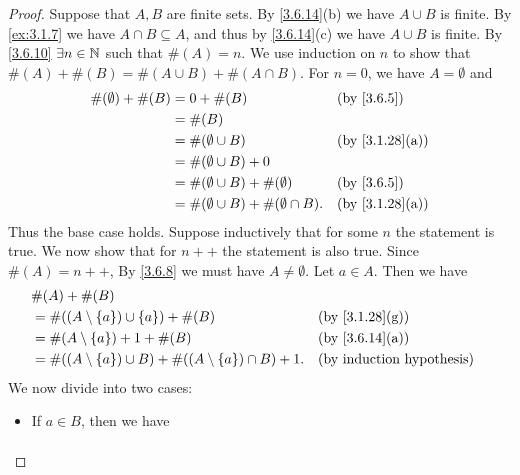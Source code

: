 \begin{proof}
  Suppose that \(A, B\) are finite sets.
  By \cref{3.6.14}(b) we have \(A \cup B\) is finite.
  By \cref{ex:3.1.7} we have \(A \cap B \subseteq A\), and thus by \cref{3.6.14}(c) we have \(A \cup B\) is finite.
  By \cref{3.6.10} \(\exists n \in \mathbb{N}\) such that \(\#(A) = n\).
  We use induction on \(n\) to show that \(\#(A) + \#(B) = \#(A \cup B) + \#(A \cap B)\).
  For \(n = 0\), we have \(A = \emptyset\) and
  \begin{align*}
    \#(\emptyset) + \#(B) & = 0 + \#(B)                                    &  & \by{3.6.5}                   \\
                          & = \#(B)                                                                          \\
                          & = \#(\emptyset \cup B)                         &  & \text{(by \cref{3.1.28}(a))} \\
                          & = \#(\emptyset \cup B) + 0                                                       \\
                          & = \#(\emptyset \cup B) + \#(\emptyset)         &  & \by{3.6.5}                   \\
                          & = \#(\emptyset \cup B) + \#(\emptyset \cap B). &  & \text{(by \cref{3.1.28}(a))}
  \end{align*}
  Thus the base case holds.
  Suppose inductively that for some \(n\) the statement is true.
  We now show that for \(n++\) the statement is also true.
  Since \(\#(A) = n++\), By \cref{3.6.8} we must have \(A \neq \emptyset\).
  Let \(a \in A\).
  Then we have
  \begin{align*}
     & \#(A) + \#(B)                                                                                            \\
     & = \#((A \setminus \{a\}) \cup \{a\}) + \#(B)                           &  & \text{(by \cref{3.1.28}(g))} \\
     & = \#(A \setminus \{a\}) + 1 + \#(B)                                    &  & \text{(by \cref{3.6.14}(a))} \\
     & = \#((A \setminus \{a\}) \cup B) + \#((A \setminus \{a\}) \cap B) + 1. &  & \byIH
  \end{align*}
  We now divide into two cases:
  \begin{itemize}
    \item If \(a \in B\), then we have
          \begin{align*}

\end{align*}
\end{itemize}
\end{proof}
